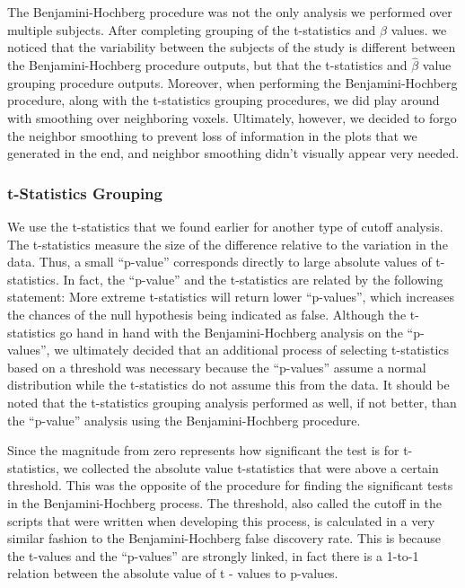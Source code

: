 \par The Benjamini-Hochberg procedure was not the only analysis we performed 
over multiple subjects. After completing grouping of the t-statistics and 
$\hat{\beta}$ values. we noticed that the variability between the subjects 
of the study is different between the Benjamini-Hochberg procedure outputs, 
but that the t-statistics and $\hat{\beta}$ value grouping procedure 
outputs. Moreover, when performing the Benjamini-Hochberg procedure, along with
the t-statistics grouping procedures, we did play around with smoothing over 
neighboring voxels. Ultimately, however, we decided to forgo the neighbor 
smoothing to prevent loss of information in the plots that we generated in the 
end, and neighbor smoothing didn't visually appear very needed.



\subsubsection{t-Statistics Grouping}

\par We use the t-statistics that we found earlier for another type of cutoff
analysis. The t-statistics measure the size of the difference relative to the 
variation in the data. Thus, a small ``p-value'' corresponds directly to large
absolute values of t-statistics. In fact, the ``p-value'' and the t-statistics
are related by the following statement: More extreme t-statistics will return 
lower ``p-values'', which increases the chances of the null hypothesis being 
indicated as false. Although the t-statistics go hand in hand with the 
Benjamini-Hochberg analysis on the ``p-values'', we ultimately decided that an 
additional process of selecting t-statistics based on a threshold was 
necessary because the ``p-values'' assume a normal distribution while the 
t-statistics do not assume this from the data. It should be noted that the 
t-statistics grouping analysis performed as well, if not better, than the 
``p-value'' analysis using the Benjamini-Hochberg procedure.

\par Since the magnitude from zero represents how significant the test is for
t-statistics, we collected the absolute value t-statistics that were above a 
certain threshold. This was the opposite of the procedure for finding the 
significant tests in the Benjamini-Hochberg process. The threshold, also called
the cutoff in the scripts that were written when developing this process, is 
calculated in a very similar fashion to the Benjamini-Hochberg false discovery 
rate. This is because the t-values and the ``p-values'' are strongly linked, in 
fact there is a 1-to-1 relation between the absolute value of t - values to 
p-values.

